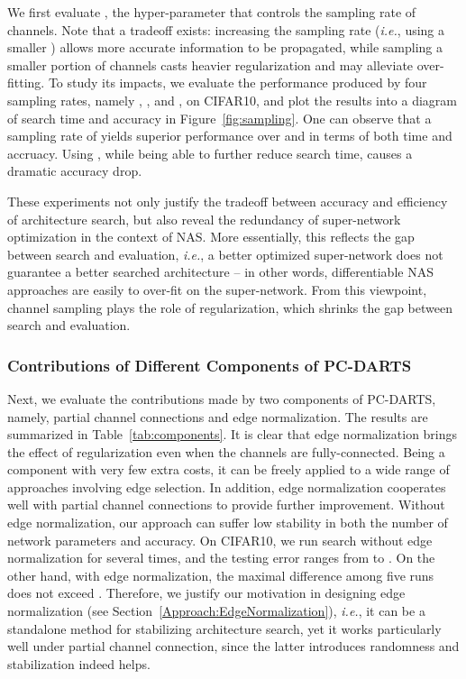 \documentclass{article} \usepackage{iclr2020_conference,times}
\begin{document}
We first evaluate , the hyper-parameter that controls the sampling rate of channels. Note that a tradeoff exists: increasing the sampling rate (\textit{i.e.}, using a smaller ) allows more accurate information to be propagated, while sampling a smaller portion of channels casts heavier regularization and may alleviate over-fitting. To study its impacts, we evaluate the performance produced by four sampling rates, namely , ,  and , on CIFAR10, and plot the results into a diagram of search time and accuracy in Figure~\ref{fig:sampling}. One can observe that a sampling rate of  yields superior performance over  and  in terms of both time and accruacy. Using , while being able to further reduce search time, causes a dramatic accuracy drop.

These experiments not only justify the tradeoff between accuracy and efficiency of architecture search, but also reveal the redundancy of super-network optimization in the context of NAS. More essentially, this reflects the gap between search and evaluation, \textit{i.e.}, a better optimized super-network does not guarantee a better searched architecture -- in other words, differentiable NAS approaches are easily to over-fit on the super-network. From this viewpoint, channel sampling plays the role of regularization, which shrinks the gap between search and evaluation.



\subsubsection{Contributions of Different Components of PC-DARTS}
\label{Experiments:Ablation:Components}

Next, we evaluate the contributions made by two components of PC-DARTS, namely, partial channel connections and edge normalization. The results are summarized in Table~\ref{tab:components}. It is clear that edge normalization brings the effect of regularization even when the channels are fully-connected. Being a component with very few extra costs, it can be freely applied to a wide range of approaches involving edge selection. In addition, edge normalization cooperates well with partial channel connections to provide further improvement. Without edge normalization, our approach can suffer low stability in both the number of network parameters and accuracy. On CIFAR10, we run search without edge normalization for several times, and the testing error ranges from  to . On the other hand, with edge normalization, the maximal difference among five runs does not exceed . Therefore, we justify our motivation in designing edge normalization (see Section~\ref{Approach:EdgeNormalization}), \textit{i.e.}, it can be a standalone method for stabilizing architecture search, yet it works particularly well under partial channel connection, since the latter introduces randomness and stabilization indeed helps.
\end{document}
